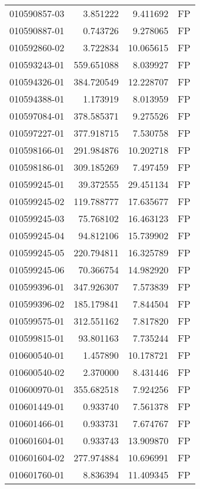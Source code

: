 \begin{tabular}{lrrl}
010590857-03 &    3.851222 &       9.411692 &   FP \\
010590887-01 &    0.743726 &       9.278065 &   FP \\
010592860-02 &    3.722834 &      10.065615 &   FP \\
010593243-01 &  559.651088 &       8.039927 &   FP \\
010594326-01 &  384.720549 &      12.228707 &   FP \\
010594388-01 &    1.173919 &       8.013959 &   FP \\
010597084-01 &  378.585371 &       9.275526 &   FP \\
010597227-01 &  377.918715 &       7.530758 &   FP \\
010598166-01 &  291.984876 &      10.202718 &   FP \\
010598186-01 &  309.185269 &       7.497459 &   FP \\
010599245-01 &   39.372555 &      29.451134 &   FP \\
010599245-02 &  119.788777 &      17.635677 &   FP \\
010599245-03 &   75.768102 &      16.463123 &   FP \\
010599245-04 &   94.812106 &      15.739902 &   FP \\
010599245-05 &  220.794811 &      16.325789 &   FP \\
010599245-06 &   70.366754 &      14.982920 &   FP \\
010599396-01 &  347.926307 &       7.573839 &   FP \\
010599396-02 &  185.179841 &       7.844504 &   FP \\
010599575-01 &  312.551162 &       7.817820 &   FP \\
010599815-01 &   93.801163 &       7.735244 &   FP \\
010600540-01 &    1.457890 &      10.178721 &   FP \\
010600540-02 &    2.370000 &       8.431446 &   FP \\
010600970-01 &  355.682518 &       7.924256 &   FP \\
010601449-01 &    0.933740 &       7.561378 &   FP \\
010601466-01 &    0.933731 &       7.674767 &   FP \\
010601604-01 &    0.933743 &      13.909870 &   FP \\
010601604-02 &  277.974884 &      10.696991 &   FP \\
010601760-01 &    8.836394 &      11.409345 &   FP \\

\end{tabular}
